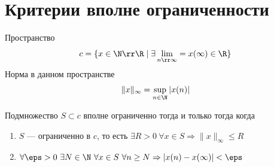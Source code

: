 \newpage
\section{Критерии вполне ограниченности}
\begin{definition}
	Пространство 
	$$
	c = \{x \in \N \rr \R \mid \exists \lim\limits_{n \rr \infty} = x(\infty) \in \R\}
	$$
	Норма в данном пространстве 
	$$
	\|x\|_\infty = \sup\limits_{n \in \N} |x(n)|
	$$
\end{definition}
\begin{theorem}
	Подмножество $S \subset c$ вполне ограниченно тогда и только тогда когда
	\begin{enumerate}
		\item $S$ --- ограниченно в $c$, то есть $\exists R > 0  \ \forall x \in S \Rightarrow \|x\|_\infty \leq R$
		\item $\forall \eps > 0 \ \exists N \in \N \ \forall x \in S \ \forall n \geq N \Rightarrow |x(n) - x(\infty)| < \eps$
	\end{enumerate}
\end{theorem}
